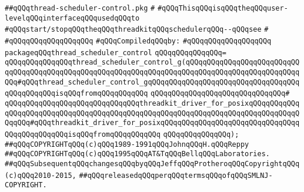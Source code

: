 \label{src/lib/src/lib/thread-kit/src/posix/thread-scheduler-control.pkg}
\verb|##qQQqthread-scheduler-control.pkg|\newline
\verb|#|\newline
\verb|#qQQqThisqQQqisqQQqtheqQQquser-levelqQQqinterfaceqQQqusedqQQqto|\newline
\verb|#qQQqstart/stopqQQqtheqQQqthreadkitqQQqschedulerqQQq--qQQqsee|\newline
\verb|#|\newline
\verb|#qQQqqQQqqQQqqQQqqQQq|\newline
\newline
\verb|#qQQqCompiledqQQqby:|\newline
\verb|#qQQqqQQqqQQqqQQqqQQq|\newline
\newline
\newline
\verb|packageqQQqthread_scheduler_control|\newline
\verb|qQQqqQQqqQQqqQQq=|\newline
\verb|qQQqqQQqqQQqqQQqthread_scheduler_control_g(qQQqqQQqqQQqqQQqqQQqqQQqqQQqqQQqqQQqqQQqqQQqqQQqqQQqqQQqqQQqqQQqqQQqqQQqqQQqqQQqqQQqqQQqqQQqqQQqqQQq#qQQqthread_scheduler_control_gqQQqqQQqqQQqqQQqqQQqqQQqqQQqqQQqqQQqqQQqqQQqqQQqisqQQqfromqQQqqQQqqQQq|\newline
\verb|qQQqqQQqqQQqqQQqqQQqqQQqqQQqqQQq#|\newline
\verb|qQQqqQQqqQQqqQQqqQQqqQQqqQQqqQQqthreadkit_driver_for_posixqQQqqQQqqQQqqQQqqQQqqQQqqQQqqQQqqQQqqQQqqQQqqQQqqQQqqQQqqQQqqQQqqQQqqQQqqQQqqQQqqQQqqQQq#qQQqthreadkit_driver_for_posixqQQqqQQqqQQqqQQqqQQqqQQqqQQqqQQqqQQqqQQqqQQqqQQqisqQQqfromqQQqqQQqqQQq|\newline
\verb|qQQqqQQqqQQqqQQq);|\newline
\newline
\newline
\newline
\verb|##qQQqCOPYRIGHTqQQq(c)qQQq1989-1991qQQqJohnqQQqH.qQQqReppy|\newline
\verb|##qQQqCOPYRIGHTqQQq(c)qQQq1995qQQqAT&TqQQqBellqQQqLaboratories.|\newline
\verb|##qQQqSubsequentqQQqchangesqQQqbyqQQqJeffqQQqProtheroqQQqCopyrightqQQq(c)qQQq2010-2015,|\newline
\verb|##qQQqreleasedqQQqperqQQqtermsqQQqofqQQqSMLNJ-COPYRIGHT.|\newline

